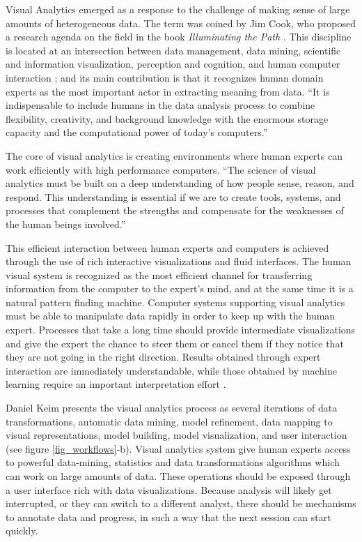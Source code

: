 Visual Analytics emerged as a response to the challenge of making sense of large amounts of heterogeneous data. The term was coined by Jim Cook, who proposed a research agenda on the field in the book \emph{Illuminating the Path} \autocite{cook_illuminating_2005}. This discipline is located at an intersection between data management, data mining, scientific and information visualization, perception and cognition, and human computer interaction \autocite{keim_visual_2008}; and its main contribution is that it recognizes human domain experts as the most important actor in extracting meaning from data.
``It is indispensable to include humans in the data analysis process to combine flexibility, creativity, and background knowledge with the enormous storage capacity and the computational power of today’s computers.'' \autocite{keim_visual_2008}

The core of visual analytics is creating environments where human experts can work efficiently with high performance computers.
``The science of visual analytics must be built on a deep understanding of how
people sense, reason, and respond. This understanding is essential if we are to create
tools, systems, and processes that complement the strengths and compensate for the
weaknesses of the human beings involved.'' \autocite{cook_illuminating_2005}

This efficient interaction between human experts and computers is achieved through the use of rich interactive visualizations and fluid interfaces. The human visual system is recognized as the most efficient channel for transferring information from the computer to the expert's mind, and at the same time it is a natural pattern finding machine. Computer systems supporting visual analytics must be able to manipulate data rapidly in order to keep up with the human expert. Processes that take a long time should provide intermediate visualizations and give the expert the chance to steer them or cancel them if they notice that they are not going in the right direction. Results obtained through expert interaction are immediately understandable, while those obtained by machine learning require an important interpretation effort \autocite{stahl_overview_2013}.

Daniel Keim presents the visual analytics process as several iterations of data transformations, automatic data mining, model refinement, data mapping to visual representations, model building, model visualization, and user interaction \autocite{keim_mastering_2010} (see figure \ref{fig_workflows}-b). Visual analytics system give human experts access to powerful data-mining, statistics and data transformations algorithms which can work on large amounts of data. These operations should be exposed through a user interface rich with data visualizations. Because analysis will likely get interrupted, or they can switch to a different analyst, there should be mechanisms to annotate data and progress, in such a way that the next session can start quickly. 

